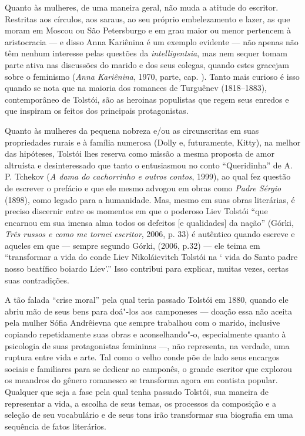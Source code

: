 Quanto às mulheres, de uma maneira geral, não muda a atitude do
escritor. Restritas aos círculos, aos saraus, ao seu próprio
embelezamento e lazer, as que moram em Moscou ou São Petersburgo e em
grau maior ou menor pertencem à aristocracia --- e disso Anna Kariênina é
um exemplo evidente --- não apenas não têm nenhum interesse pelas
questões da \emph{intelligentsia}, mas nem sequer tomam parte ativa nas
discussões do marido e dos seus colegas, quando estes gracejam sobre o
feminismo (\emph{Anna Kariênina}, 1970,  parte, cap. ). Tanto mais
curioso é isso quando se nota que na maioria dos romances de Turguênev
(1818--1883), contemporâneo de Tolstói, são as heroinas populistas
que regem seus enredos e que inspiram os feitos dos principais
protagonistas.

Quanto às mulheres da pequena nobreza e/ou as circunscritas em
suas propriedades rurais e à família numerosa (Dolly e, futuramente,
Kitty), na melhor das hipóteses, Tolstói lhes reserva como missão a
mesma proposta de amor altruísta e desinteressado que tanto o
entusiasmou no conto ``Queridinha'' de A. P. Tchekov (\emph{A dama do
cachorrinho e outros contos}, 1999), ao qual fez questão de escrever o
prefácio e que ele mesmo advogou em obras como \emph{Padre Sérgio} (1898), como legado para a humanidade. Mas, mesmo em suas obras
literárias, é preciso discernir entre os momentos em que o
poderoso Liev Tolstói ``que encarnou em sua imensa alma todos os
defeitos [e qualidades] da nação'' (Górki, \emph{Três russos e como
me tornei escritor}, 2006, p. 33) é autêntico
quando escreve e aqueles em que --- sempre segundo Górki, (2006, p.32)
--- ele teima em ``transformar a vida do conde Liev Nikoláievitch
Tolstói na ` vida do Santo padre nosso beatífico boiardo Liev'.'' Isso
contribui para explicar, muitas vezes, certas suas contradições.

A tão falada ``crise moral'' pela qual teria passado Tolstói em
1880, quando ele abriu mão de seus bens para doá"-los aos camponeses
--- doação essa não aceita pela mulher Sófia Andrêievna que sempre
trabalhou com o marido, inclusive copiando repetidamente suas obras e
aconselhando"-o, especialmente quanto à psicologia de suas protagonistas
femininas ---, não representa, na verdade, uma ruptura entre vida e
arte. Tal como o velho conde põe de lado seus encargos sociais e
familiares para se dedicar ao camponês, o grande escritor que explorou
os meandros do gênero romanesco se transforma agora em contista popular.
Qualquer que seja a fase pela qual tenha passado Tolstói, sua maneira de
representar a vida, a escolha de seus temas, os processos da composição
e a seleção de seu vocabulário e de seus tons irão transformar sua
biografia em uma sequência de fatos literários.

